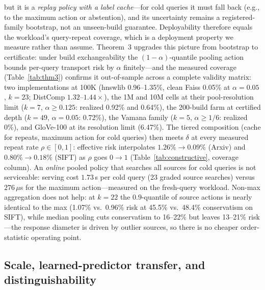 \documentclass{article}
\begin{document}
but it is a \emph{replay policy with a label cache}---for cold queries it must fall back (e.g., to the
maximum action or abstention), and its uncertainty remains a registered-family bootstrap, not an
unseen-build guarantee. Deployability therefore equals the workload's query-repeat coverage, which is a
deployment property we measure rather than assume. Theorem~3 upgrades this picture from bootstrap to
certificate: under build exchangeability the $(1{-}\alpha)$-quantile pooling action bounds per-query
transport risk by $\alpha$ finitely---and the measured coverage (Table~\ref{tab:thm3}) confirms it
out-of-sample across a complete validity matrix: two implementations at 100K (hnswlib 0.96--1.35\%,
clean Faiss 0.05\% at $\alpha{=}0.05$, $k{=}23$; DistComp $1.32$--$1.44\times$), the 1M and 10M cells
at their pool-resolution limit ($k{=}7$, $\alpha{\ge}0.125$: realized 0.92\% and 0.64\%), the
200-build farm at certified depth ($k{=}49$, $\alpha{=}0.05$: 0.72\%), the Vamana family
($k{=}5$, $\alpha{\ge}1/6$: realized 0\%), and GloVe-100 at its resolution limit (6.47\%). The tiered composition (cache for repeats, maximum action for cold
queries) then meets $\delta$ at every measured repeat rate $\rho\in[0,1]$: effective risk interpolates
$1.26\%\to0.09\%$ (Arxiv) and $0.80\%\to0.18\%$ (SIFT) as $\rho$ goes $0\to1$ (Table~\ref{tab:constructive},
coverage column). An \emph{online} pooled policy that searches all sources for cold queries is not
serviceable: serving cost $1.73$\,s per cold query (23 graded source searches) versus $276\,\mu$s for the
maximum action---measured on the fresh-query workload. Non-max aggregation does not help: at $k{=}22$ the $0.9$-quantile of source
actions is nearly identical to the max (1.07\% vs.\ 0.96\% risk at 45.5\% vs.\ 48.4\% conservatism on
SIFT), while median pooling cuts conservatism to 16--22\% but leaves 13--21\% risk---the response
diameter is driven by outlier sources, so there is no cheaper order-statistic operating point.

\subsection{Scale, learned-predictor transfer, and distinguishability}
\label{sec:scale}
\end{document}
